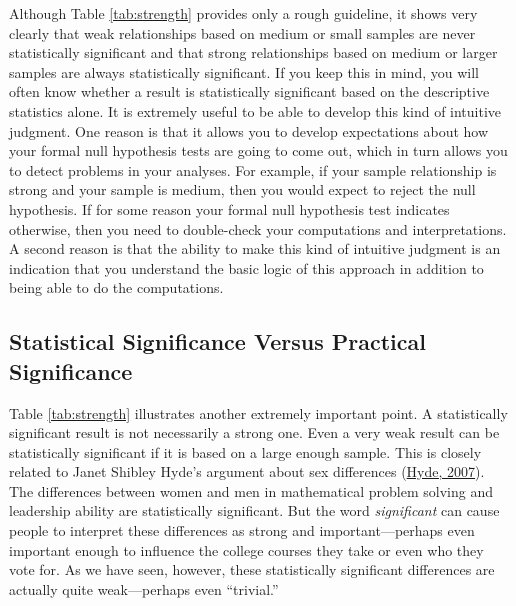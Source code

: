 \documentclass[
]{krantz}
\begin{document}
Although Table \ref{tab:strength} provides only a rough guideline, it shows very clearly that weak relationships based on medium or small samples are never statistically significant and that strong relationships based on medium or larger samples are always statistically significant. If you keep this in mind, you will often know whether a result is statistically significant based on the descriptive statistics alone. It is extremely useful to be able to develop this kind of intuitive judgment. One reason is that it allows you to develop expectations about how your formal null hypothesis tests are going to come out, which in turn allows you to detect problems in your analyses. For example, if your sample relationship is strong and your sample is medium, then you would expect to reject the null hypothesis. If for some reason your formal null hypothesis test indicates otherwise, then you need to double-check your computations and interpretations. A second reason is that the ability to make this kind of intuitive judgment is an indication that you understand the basic logic of this approach in addition to being able to do the computations.

\hypertarget{statistical-significance-versus-practical-significance}{%
\subsection*{Statistical Significance Versus Practical Significance}\label{statistical-significance-versus-practical-significance}}


Table \ref{tab:strength} illustrates another extremely important point. A statistically significant result is not necessarily a strong one. Even a very weak result can be statistically significant if it is based on a large enough sample. This is closely related to Janet Shibley Hyde's argument about sex differences (\protect\hyperlink{ref-hyde2007new}{Hyde, 2007}). The differences between women and men in mathematical problem solving and leadership ability are statistically significant. But the word \emph{significant} can cause people to interpret these differences as strong and important---perhaps even important enough to influence the college courses they take or even who they vote for. As we have seen, however, these statistically significant differences are actually quite weak---perhaps even ``trivial.''
\end{document}
